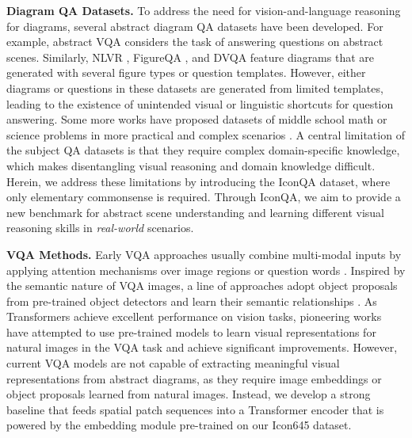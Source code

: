 \documentclass{article}
\begin{document}
\textbf{Diagram QA Datasets.} To address the need for vision-and-language reasoning for diagrams, several abstract diagram QA datasets have been developed. For example, abstract VQA \cite{antol2015vqa, balanced_binary_vqa} considers the task of answering questions on abstract scenes. Similarly, NLVR \cite{suhr2017corpus}, FigureQA \cite{kahou2017figureqa}, and DVQA \cite{kafle2018dvqa} feature diagrams that are generated with several figure types or question templates. However, either diagrams or questions in these datasets are generated from limited templates, leading to the existence of unintended visual or linguistic shortcuts for question answering. Some more works have proposed datasets of middle school math or science problems in more practical and complex scenarios \cite{seo2015solving, kembhavi2017you, sachan2017textbooks,sachan2018learning,lu2021inter}.  A central limitation of the subject QA datasets is that they require complex domain-specific knowledge, which makes disentangling visual reasoning and domain knowledge difficult. Herein, we address these limitations by introducing the IconQA dataset, where only elementary commonsense is required. Through IconQA, we aim to provide a new benchmark for abstract scene understanding and learning different visual reasoning skills in \textit{real-world} scenarios.



\textbf{VQA Methods.} Early VQA approaches usually combine multi-modal inputs by applying attention mechanisms over image regions or question words \cite{Kim2018,lu2018co,lu2018rvqa,gao2018question,yu2019mcan,gao2019dynamic}. Inspired by the semantic nature of VQA images, a line of approaches adopt object proposals from pre-trained object detectors and learn their semantic relationships \cite{Kim2018,yu2019mcan,gao2019dynamic}. As Transformers achieve excellent performance on vision tasks, pioneering works have attempted to use pre-trained models to learn visual representations for natural images in the VQA task \cite{lu2019vilbert, li2019visualbert,chen2020uniter,pmlr-v139-kim21k} and achieve significant improvements. However, current VQA models are not capable of extracting meaningful visual representations from abstract diagrams, as they require image embeddings or object proposals learned from natural images. Instead, we develop a strong baseline that feeds spatial patch sequences into a Transformer encoder that is powered by the embedding module pre-trained on our Icon645 dataset. 
\end{document}
